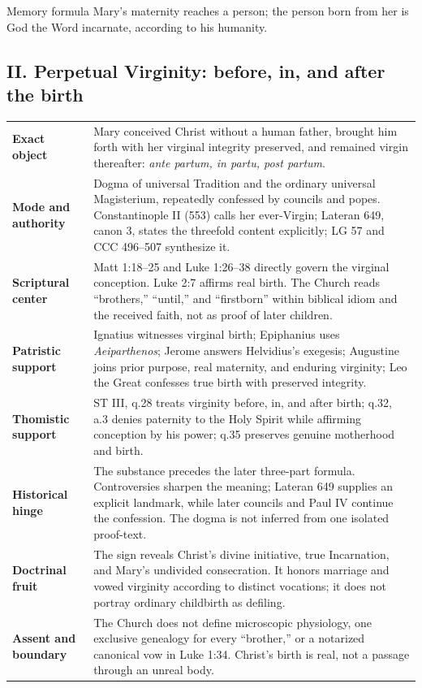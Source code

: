 \begin{studybox}{Memory formula}
Mary's maternity reaches a person; the person born from her is God the Word incarnate, according to his humanity.
\end{studybox}
\endgroup
\clearpage
\subsection*{II. Perpetual Virginity: before, in, and after the birth}
{}

\begingroup
\footnotesize
\renewcommand{\arraystretch}{1.12}
\begin{tabularx}{\textwidth}{@{}>{\raggedright\arraybackslash\bfseries}p{}X@{}}
\toprule
Exact object & Mary conceived Christ without a human father, brought him forth with her virginal integrity preserved, and remained virgin thereafter: \emph{ante partum, in partu, post partum}.\\
Mode and authority & Dogma of universal Tradition and the ordinary universal Magisterium, repeatedly confessed by councils and popes. Constantinople II (553) calls her ever-Virgin; Lateran 649, canon 3, states the threefold content explicitly; LG 57 and CCC 496--507 synthesize it.\\
Scriptural center & Matt 1:18--25 and Luke 1:26--38 directly govern the virginal conception. Luke 2:7 affirms real birth. The Church reads “brothers,” “until,” and “firstborn” within biblical idiom and the received faith, not as proof of later children.\\
Patristic support & Ignatius witnesses virginal birth; Epiphanius uses \emph{Aeiparthenos}; Jerome answers Helvidius's exegesis; Augustine joins prior purpose, real maternity, and enduring virginity; Leo the Great confesses true birth with preserved integrity.\\
Thomistic support & ST III, q.28 treats virginity before, in, and after birth; q.32, a.3 denies paternity to the Holy Spirit while affirming conception by his power; q.35 preserves genuine motherhood and birth.\\
Historical hinge & The substance precedes the later three-part formula. Controversies sharpen the meaning; Lateran 649 supplies an explicit landmark, while later councils and Paul IV continue the confession. The dogma is not inferred from one isolated proof-text.\\
Doctrinal fruit & The sign reveals Christ's divine initiative, true Incarnation, and Mary's undivided consecration. It honors marriage and vowed virginity according to distinct vocations; it does not portray ordinary childbirth as defiling.\\
Assent and boundary & The Church does not define microscopic physiology, one exclusive genealogy for every “brother,” or a notarized canonical vow in Luke 1:34. Christ's birth is real, not a passage through an unreal body.\\
\bottomrule
\end{tabularx}

